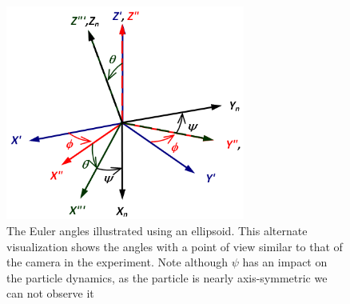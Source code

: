 \begin{figure}
\begin{center}
\includegraphics[width=0.7\textwidth]{figures/theory/EulerAngles.png}
\end{center}
\caption{The Euler angles illustrated using an ellipsoid. This alternate visualization shows the angles with a point of view similar to that of the camera in the experiment. Note although $\psi$ has an impact on the particle dynamics, as the particle is nearly axis-symmetric we can not observe it}
\label{fig:eulerparticle}
\end{figure}

